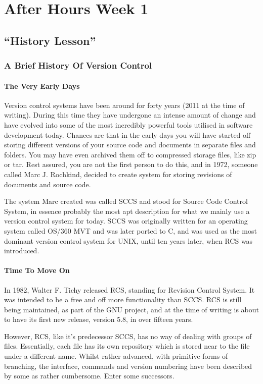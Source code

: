 \chapter{After Hours Week 1}
\section{``History Lesson''}
\subsection{A Brief History Of Version Control}

\subsubsection{The Very Early Days}
Version control systems have been around for forty years (2011 at the time of writing).
During this time they have undergone an intense amount of change and have evolved into some of the most incredibly powerful tools utilised in software development today.
Chances are that in the early days you will have started off storing different versions of your source code and documents in separate files and folders.
You may have even archived them off to compressed storage files, like zip or tar.
Rest assured, you are not the first person to do this, and in 1972, someone called Marc J.
Rochkind, decided to create system for storing revisions of documents and source code.

The system Marc created was called SCCS and stood for Source Code Control System, in essence probably the most apt description for what we mainly use a version control system for today.
SCCS was originally written for an operating system called OS/360 MVT and was later ported to C, and was used as the most dominant version control system for UNIX, until ten years later, when RCS was introduced.

\subsubsection{Time To Move On}
In 1982, Walter F.
Tichy released RCS, standing for Revision Control System.
It was intended to be a free and off more functionality than SCCS.
RCS is still being maintained, as part of the GNU project, and at the time of writing is about to have its first new release, version 5.8, in over fifteen years.

However, RCS, like it's predecessor SCCS, has no way of dealing with groups of files.
Essentially, each file has its own repository which is stored near to the file under a different name.
Whilst rather advanced, with primitive forms of branching, the interface, commands and version numbering have been described by some as rather cumbersome.
Enter some successors.

